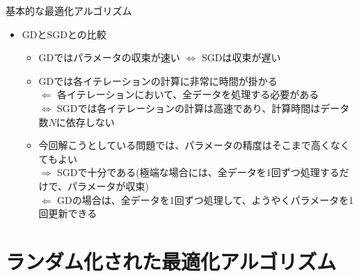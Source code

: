\documentclass[dvipdfmx,notheorems,t]{beamer}
\begin{document}
\begin{frame}{基本的な最適化アルゴリズム}

\begin{itemize}
	\item GDとSGDとの比較
	\begin{itemize}
		\item GDではパラメータの収束が速い $\Leftrightarrow$ SGDは収束が遅い
		\newline
		
		\item GDでは各イテレーションの計算に非常に時間が掛かる \\
		$\Leftarrow$ 各イテレーションにおいて、全データを処理する必要がある \\
		$\Leftrightarrow$ SGDでは各イテレーションの計算は高速であり、計算時間はデータ数$N$に依存しない
		\newline
		
		\item 今回解こうとしている問題では、パラメータの精度はそこまで高くなくてもよい \\
		$\Rightarrow$ SGDで十分である(極端な場合には、全データを1回ずつ処理するだけで、パラメータが収束) \\
		$\Leftarrow$ GDの場合は、全データを1回ずつ処理して、ようやくパラメータを1回更新できる
	\end{itemize}
\end{itemize}

\end{frame}

\section{ランダム化された最適化アルゴリズム}
\end{document}

